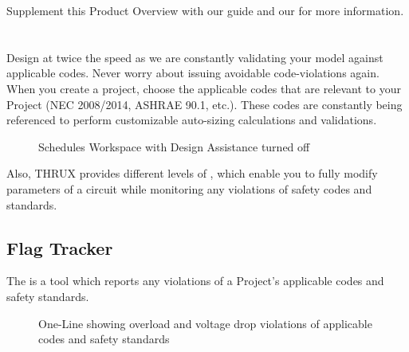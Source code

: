 \documentclass[letterpaper,10pt,english]{sphinxmanual}
\begin{document}
Supplement this Product Overview with our {\hyperref[\detokenize{docs/userguide/index-user_guide:user-guide}]{}} guide and our {\hyperref[\detokenize{docs/faq:frequently-asked-questions}]{}} for more information.


\section{}
\label{\detokenize{docs/productoverview/index-product_overview:code-compliant-design}}\label{\detokenize{docs/productoverview/index-product_overview::doc}}
Design at twice the speed as we are constantly validating your model against applicable codes.  Never worry about issuing avoidable code-violations again.  When you create a project, choose the applicable codes that are relevant to your Project (NEC 2008/2014, ASHRAE 90.1, etc.).  These codes are constantly being referenced to perform customizable auto-sizing calculations and validations.

\begin{figure}[H]
\centering
\capstart

\noindent{}
\caption{Schedules Workspace with Design Assistance turned off}\label{\detokenize{docs/productoverview/index-product_overview:id1}}\end{figure}

Also, THRUX provides different levels of {\hyperref[\detokenize{docs/userguide/explorersandutilitytools/statusbar/index-status_bar:design-assistance}]{}}, which enable you to fully modify parameters of a circuit while monitoring any violations of safety codes and standards.


\subsection{Flag Tracker}
\label{\detokenize{docs/productoverview/index-product_overview:flag-tracker}}
The {\hyperref[\detokenize{docs/userguide/buildingelectricalmodel/flagtracker/index-flag_tracker:flag-tracker}]{}} is a tool which reports any violations of a Project’s applicable codes and safety standards.

\begin{figure}[H]
\centering
\capstart

\noindent{}
\caption{One-Line showing overload and voltage drop violations of applicable codes and safety standards}\label{\detokenize{docs/productoverview/index-product_overview:id2}}\end{figure}
\end{document}
